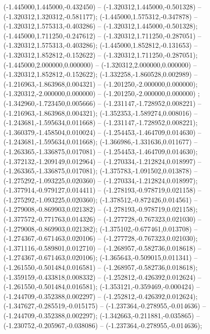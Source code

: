  (-1.445000,1.445000,-0.432450) -- (-1.320312,1.445000,-0.501328) -- (-1.320312,1.320312,-0.581177);
 (-1.445000,1.575312,-0.347878) -- (-1.320312,1.575313,-0.403286) -- (-1.320312,1.445000,-0.501328);
 (-1.445000,1.711250,-0.247612) -- (-1.320312,1.711250,-0.287051) -- (-1.320312,1.575313,-0.403286);
 (-1.445000,1.852812,-0.131653) -- (-1.320312,1.852812,-0.152622) -- (-1.320312,1.711250,-0.287051);
 (-1.445000,2.000000,0.000000) -- (-1.320312,2.000000,0.000000) -- (-1.320312,1.852812,-0.152622);
 (-1.332258,-1.860528,0.002989) -- (-1.216963,-1.863968,0.004321) -- (-1.201250,-2.000000,0.000000);
 (-1.320312,-2.000000,0.000000) -- (-1.201250,-2.000000,0.000000) ;
 (-1.342960,-1.723450,0.005666) -- (-1.231147,-1.728952,0.008221) -- (-1.216963,-1.863968,0.004321);
 (-1.352353,-1.589274,0.008016) -- (-1.243681,-1.595634,0.011668) -- (-1.231147,-1.728952,0.008221);
 (-1.360379,-1.458504,0.010024) -- (-1.254453,-1.464709,0.014630) -- (-1.243681,-1.595634,0.011668);
 (-1.366986,-1.331636,0.011677) -- (-1.263365,-1.336875,0.017081) -- (-1.254453,-1.464709,0.014630);
 (-1.372132,-1.209149,0.012964) -- (-1.270334,-1.212824,0.018997) -- (-1.263365,-1.336875,0.017081);
 (-1.375783,-1.091502,0.013878) -- (-1.275292,-1.093225,0.020360) -- (-1.270334,-1.212824,0.018997);
 (-1.377914,-0.979127,0.014411) -- (-1.278193,-0.978719,0.021158) -- (-1.275292,-1.093225,0.020360);
 (-1.378512,-0.872426,0.014561) -- (-1.279008,-0.869903,0.021382) -- (-1.278193,-0.978719,0.021158);
 (-1.377572,-0.771763,0.014326) -- (-1.277728,-0.767323,0.021030) -- (-1.279008,-0.869903,0.021382);
 (-1.375102,-0.677461,0.013708) -- (-1.274367,-0.671463,0.020106) -- (-1.277728,-0.767323,0.021030);
 (-1.371116,-0.589801,0.012710) -- (-1.268957,-0.582736,0.018618) -- (-1.274367,-0.671463,0.020106);
 (-1.365643,-0.509015,0.011341) -- (-1.261550,-0.501484,0.016581) -- (-1.268957,-0.582736,0.018618);
 (-1.359159,-0.433818,0.008332) -- (-1.252812,-0.426392,0.012624) -- (-1.261550,-0.501484,0.016581);
 (-1.353121,-0.359469,-0.000424) -- (-1.244709,-0.352388,0.002297) -- (-1.252812,-0.426392,0.012624);
 (-1.347627,-0.285519,-0.015175) -- (-1.237364,-0.278955,-0.014636) -- (-1.244709,-0.352388,0.002297);
 (-1.342663,-0.211881,-0.035865) -- (-1.230752,-0.205967,-0.038086) -- (-1.237364,-0.278955,-0.014636);
